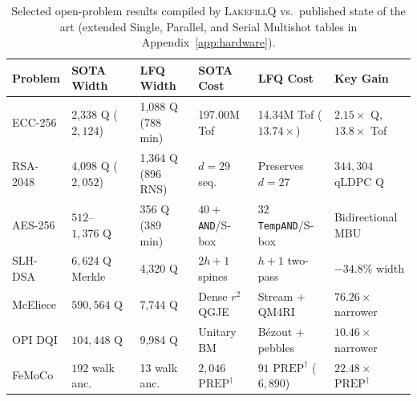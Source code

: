 \documentclass[acmsmall,screen,anonymous]{acmart}
\DeclareRobustCommand{\_}{\ifmmode\text{\char95}\else\char95\penalty0\relax\fi}
\theoremstyle{plain}
\newcommand{\LakefillQ}{\textsc{LakefillQ}}
\begin{document}
\begin{table}[t]
\centering
\caption{Selected open-problem results compiled by \LakefillQ{} vs.\ published state of the art (extended Single, Parallel, and Serial Multishot tables in Appendix~\ref{app:hardware}).}
\label{tab:t18_main}
\footnotesize
\setlength{\tabcolsep}{4pt}
\begin{tabular}{llllll}
\toprule
Problem & SOTA Width & LFQ Width & SOTA Cost & LFQ Cost & Key Gain \\
\midrule
ECC-256 & 2,338 Q ($2{,}124$)~\cite{haner2020} & 1,088 Q (788 min) & 197.00M Tof & 14.34M Tof ($13.74\times$) & $2.15\times$ Q, $13.8\times$ Tof \\
RSA-2048 & 4,098 Q ($2{,}052$)~\cite{gidneyekera2021,chevignard2024} & 1,364 Q (896 RNS) & $d = 29$ seq. & Preserves $d = 27$ & $344{,}304$ qLDPC Q \\
AES-256 & $512$--$1{,}376\text{ Q}$~\cite{jaques2020,zou2020,lin2025aes} & 356 Q (389 min) & $40{+}$ \texttt{AND}/S-box & $32$ \texttt{TempAND}/S-box & Bidirectional MBU \\
SLH-DSA & $6{,}624\text{ Q}$ Merkle & 4,320 Q & $2h+1$ spines & $h+1$ two-pass & $-34.8\%$ width \\
McEliece & $590{,}564\text{ Q}$~\cite{esser2022} & 7,744 Q & Dense $r^2$ QGJE & Stream + QM4RI & $76.26\times$ narrower \\
OPI DQI & $104{,}448\text{ Q}$~\cite{jordan2024} & 9,984 Q & Unitary BM & B\'{e}zout + pebbles & $10.46\times$ narrower \\
FeMoCo & $192$ walk anc.~\cite{lee2021thc} & 13 walk anc. & $2{,}046$ $\mathrm{PREP}^\dagger$ & $91$ $\mathrm{PREP}^\dagger$ ($6{,}890$) & $22.48\times$ $\mathrm{PREP}^\dagger$ \\
\bottomrule
\end{tabular}
\end{table}
\end{document}
